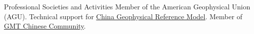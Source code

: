 \begin{rubric}{Professional Societies and Activities}
\entry*[2017 -- present] Member of the American Geophysical Union (AGU).
\entry*[2017 -- present] Technical support for \href{http://chinageorefmodel.org/}{China Geophysical Reference Model}.
\entry*[2017 -- present] Member of \href{http://gmt-china.org/}{GMT Chinese Community}.
\end{rubric}

